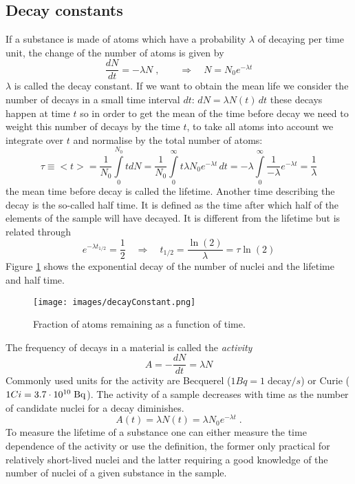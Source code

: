 \documentclass[12pt]{article}
\begin{document}
\subsection{Decay constants}
If a substance is made of atoms which have a probability $\lambda$ of decaying per time unit, the change of the number of atoms is given by
\[\frac{dN}{dt}=-\lambda N\;,\qquad\Rightarrow \quad N=N_0 e^{-\lambda t}\]
$\lambda$ is called the decay constant. If we want to obtain the mean life we consider the number of decays in a small time interval $dt$: $dN=\lambda N(t)\,dt$ these decays happen at time $t$ so in order to get the mean of the time before decay we need to weight this number of decays by the time $t$, to take all atoms into account we integrate over $t$ and normalise by the total number of atoms:
\[\tau\equiv<t>=\frac{1}{N_0}\int\limits_{0}^{N_0} t dN =\frac{1}{N_0}\int\limits_0^\infty t \lambda N_0 e^{-\lambda t}\,dt=-\lambda\int\limits_0^\infty\frac{1}{-\lambda}e^{-\lambda t}=\frac{1}{\lambda}\]
the mean time before decay is called the lifetime. Another time describing the decay is the so-called half time. It is defined as the time after which half of the elements of the sample will have decayed. It is different from the lifetime but is related through
\[e^{-\lambda t_{1/2}}=\frac12 \quad\Rightarrow \quad t_{1/2}=\frac{\ln(2)}{\lambda}=\tau \ln(2)\]
Figure \ref{fig:decayConstant} shows the exponential decay of the number of nuclei and the lifetime and half time.
\begin{figure}
\begin{center}
\texttt{[image: images/decayConstant.png]}
\caption{Fraction of atoms remaining as a function of time.}\label{fig:decayConstant}
\end{center}
\end{figure}
The frequency of decays in a material is called the \emph{activity}
\[A=-\frac{dN}{dt}=\lambda N\]
Commonly used units for the activity are Becquerel ($1 Bq=1\;\mbox{decay}/s$) or Curie ($1 Ci=3.7\cdot 10^{10}\;\rm Bq$). The activity of a sample decreases with time as the number of candidate nuclei for a decay diminishes.
\[A(t)=\lambda N(t)=\lambda N_0 e^{-\lambda t}\;.\]
To measure the lifetime of a substance one can either measure the time dependence of the activity or use the definition, the former only practical for relatively short-lived nuclei and the latter requiring a good knowledge of the number of nuclei of a given substance in the sample.

%
%
%
\end{document}
